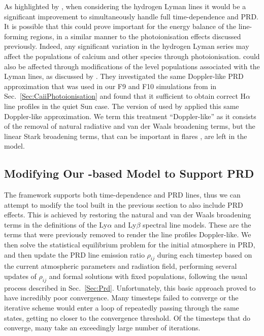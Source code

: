 As highlighted by \citet{Brown2018}, when considering the hydrogen Lyman lines it would be a significant improvement to simultaneously handle full time-dependence and PRD.
It is possible that this could prove important for the energy balance of the line-forming regions, in a similar manner to the photoionisation effects discussed previously.
Indeed, any significant variation in the hydrogen Lyman series may affect the populations of calcium and other species through photoionisation.
\Ha{} could also be affected through modifications of the level populations associated with the Lyman lines, as discussed by \citet{Leenaarts2012a}.
They investigated the same Doppler-like PRD approximation that was used in our F9 and F10 \Radyn{} simulations from in Sec.~\ref{Sec:CaiiPhotoionisation} and found that it sufficient to obtain correct H$\alpha$ line profiles in the quiet Sun case.
The version of \Radyn{} used by \citet{Brown2018} applied this same Doppler-like approximation.
We term this treatment ``Doppler-like'' as it consists of the removal of natural radiative and van der Waals broadening terms, but the linear Stark broadening terms, that can be important in flares \citep[e.g.][]{DeFeiter1975}, are left in the model.

\subsection{Modifying Our \Lw{}-based Model to Support PRD}

The \Lw{} framework supports both time-dependence and PRD lines, thus we can attempt to modify the tool built in the previous section to also include PRD effects.
This is achieved by restoring the natural and van der Waals broadening terms in the definitions of the Ly$\alpha$ and Ly$\beta$ spectral line models.
These are the terms that were previously removed to render the line profiles Doppler-like.
We then solve the statistical equilibrium problem for the initial atmosphere in PRD, and then update the PRD line emission ratio $\rho_{ij}$ during each timestep based on the current atmospheric parameters and radiation field, performing several updates of $\rho_{ij}$ and formal solutions with fixed populations, following the usual process described in Sec.~\ref{Sec:Prd}.
Unfortunately, this basic approach proved to have incredibly poor convergence.
Many timesteps failed to converge or the iterative scheme would enter a loop of repeatedly passing through the same states, getting no closer to the convergence threshold.
Of the timesteps that do converge, many take an exceedingly large number of iterations.

